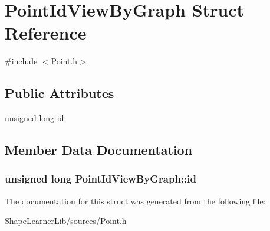 \hypertarget{struct_point_id_view_by_graph}{}\section{Point\+Id\+View\+By\+Graph Struct Reference}
\label{struct_point_id_view_by_graph}


{\ttfamily \#include $<$Point.\+h$>$}

\subsection*{Public Attributes}
\begin{DoxyCompactItemize}
\item 
unsigned long \hyperlink{struct_point_id_view_by_graph_a2c301914a779a94c2f1844e55f5cd719}{id}
\end{DoxyCompactItemize}


\subsection{Member Data Documentation}
\hypertarget{struct_point_id_view_by_graph_a2c301914a779a94c2f1844e55f5cd719}{}
\subsubsection[{id}]{\setlength{\rightskip}{0pt plus 5cm}unsigned long Point\+Id\+View\+By\+Graph\+::id}\label{struct_point_id_view_by_graph_a2c301914a779a94c2f1844e55f5cd719}


The documentation for this struct was generated from the following file\+:\begin{DoxyCompactItemize}
\item 
Shape\+Learner\+Lib/sources/\hyperlink{_point_8h}{Point.\+h}\end{DoxyCompactItemize}
